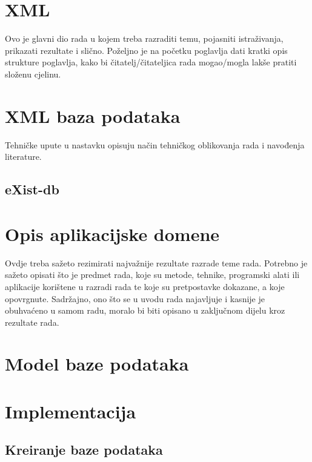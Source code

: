 \documentclass{foi}
\begin{document}
\lipsum[1]

\chapter{XML}

Ovo je glavni dio rada u kojem treba razraditi temu, pojasniti istraživanja, prikazati rezultate i slično. Poželjno je na početku poglavlja dati kratki opis strukture poglavlja, kako bi čitatelj/čitateljica rada mogao/mogla lakše pratiti složenu cjelinu.

\chapter{XML baza podataka}

Tehničke upute u nastavku opisuju način tehničkog oblikovanja rada i navođenja literature.

\section{eXist-db}

\lipsum[1]

\chapter{Opis aplikacijske domene}

Ovdje treba sažeto rezimirati najvažnije rezultate razrade teme rada. Potrebno je sažeto opisati što je predmet rada, koje su metode, tehnike, programski alati ili aplikacije korištene u razradi rada te koje su pretpostavke dokazane, a koje opovrgnute. Sadržajno, ono što se u uvodu rada najavljuje i kasnije je obuhvaćeno u samom radu, moralo bi biti opisano u zaključnom dijelu kroz rezultate rada. 

\lipsum[1-2]

\chapter{Model baze podataka}

\lipsum[1]

\chapter{Implementacija}

\section{Kreiranje baze podataka}
\end{document}

